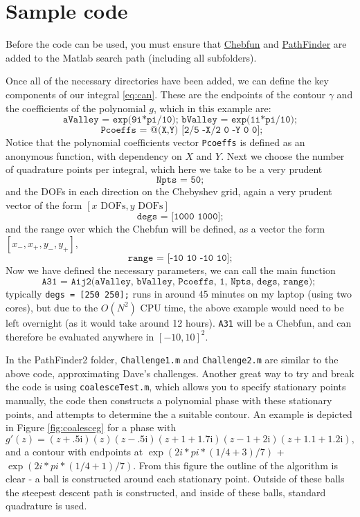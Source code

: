 \documentclass[12pt]{article}
\newcommand{\imag}{\mathrm{i}}
\begin{document}
	\section{Sample code}
	
	Before the code can be used, you must ensure that \href{https://github.com/chebfun/chebfun}{Chebfun} and \href{https://github.com/AndrewGibbs/NSDpackage}{PathFinder} are added to the Matlab search path (including all subfolders).
	
	Once all of the necessary directories have been added, we can define the key components of our integral \eqref{eq:can}. These are the endpoints of the contour $\gamma$ and the coefficients of the polynomial $g$, which in this example are:
	\[
	\texttt{aValley = exp(9i*pi/10); 	bValley = exp(1i*pi/10);}
	\]
	\[
	\texttt{	Pcoeffs = @(X,Y) [2/5 -X/2 0 -Y 0 0];}
	\]
	Notice that the polynomial coefficients vector \texttt{Pcoeffs} is defined as an anonymous function, with dependency on $X$ and $Y$. Next we choose the number of quadrature points per integral, which here we take to be a very prudent
	\[
	\texttt{Npts = 50;}
	\]
	and the DOFs in each direction on the Chebyshev grid, again a very prudent vector of the form $[x\text{ DOFs},y\text{ DOFs}]$
	\[
	\texttt{degs = [1000 1000];}
	\]
	and the range over which the Chebfun will be defined, as a vector the form $[x_-,x_+,y_-,y_+]$,
	\[
	\texttt{range = [-10 10 -10 10];}
	\]
	Now we have defined the necessary parameters, we can call the main function
	\[
	\texttt{A31 = Aij2(aValley, bValley, Pcoeffs, 1, Npts, degs, range); }
	\]
	typically \texttt{degs = [250 250];} runs in around 45 minutes on my laptop (using two cores), but due to the $O(N^2)$ CPU time, the above example would need to be left overnight (as it would take around 12 hours). \texttt{A31} will be a Chebfun, and can therefore be evaluated anywhere in $[-10,10]^2$.
	
	In the PathFinder2 folder, \texttt{Challenge1.m} and \texttt{Challenge2.m} are similar to the above code, approximating Dave's  challenges. Another great way to try and break the code is using \texttt{coalesceTest.m}, which allows you to specify stationary points manually, the code then constructs a polynomial phase with these stationary points, and attempts to determine the a suitable contour. An example is depicted in Figure \ref{fig:coalesceg} for a phase with
	\begin{equation}\label{eq:meanPhase}
	g'(z) =  (z+.5\imag)( z)(z-.5\imag)( z+1+1.7\imag)( z-1+2\imag)( z+1.1+1.2\imag),
	\end{equation}
	and a contour with endpoints at $\exp(2i*pi*(1/4 + 3)/7)$ + $\exp(2i*pi*(1/4 + 1)/7)$. From this figure the outline of the algorithm is clear - a ball is constructed around each stationary point. Outside of these balls the steepest descent path is constructed, and inside of these balls, standard quadrature is used.
	
\end{document}
